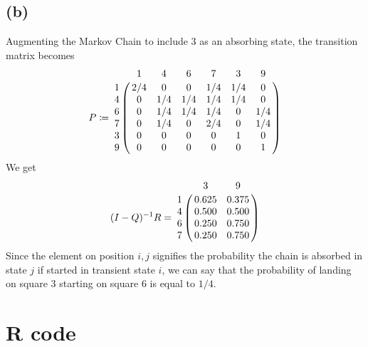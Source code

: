 \documentclass{article}
\begin{document}
\subsection{(b)}
Augmenting the Markov Chain to include $3$ as an absorbing state,
the transition matrix becomes
\begin{equation}
	P \coloneqq \bordermatrix{~ & 1 & 4 & 6 & 7 & 3 & 9 \cr
		1 & 2/4 & 0 & 0 & 1/4 & 1/4 & 0 \cr
		4 & 0 & 1/4 & 1/4 & 1/4 & 1/4 & 0 \cr
		6 & 0 & 1/4 & 1/4 & 1/4 & 0 & 1/4 \cr
		7 & 0 & 1/4 & 0 & 2/4 & 0 & 1/4 \cr
		3 & 0 & 0 & 0 & 0 & 1 & 0 \cr
		9 & 0 & 0 & 0 & 0 & 0 & 1 \cr
	}
\end{equation}
We get
\[
	(I - Q)^{-1} R = \bordermatrix{~ & 3 & 9 \cr
		1 & 0.625 & 0.375 \cr
		4 & 0.500 & 0.500 \cr
		6 & 0.250 & 0.750 \cr
		7 & 0.250 & 0.750 \cr
	}
\]
Since the element on position $i,j$ signifies the probability the chain
is absorbed in state $j$ if started in transient state $i$,
we can say that the probability of landing on square $3$ starting on square $6$ is equal to $1/4$.

\appendix
\section{R code}

\end{document}
